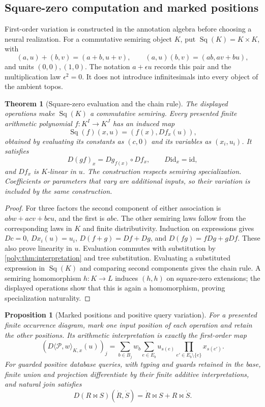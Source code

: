 \documentclass[11pt,a4paper]{article}
\newtheorem{theorem}{Theorem}[section]
\newtheorem{proposition}[proposition]{Proposition}
\theoremstyle{definition}
\theoremstyle{remark}\newaliascnt{remark}{theorem}
\newcommand{\id}{\mathrm{id}}
\numberwithin{equation}{section}
\begin{document}
\subsection{Square-zero computation and marked positions}
First-order variation is constructed in the annotation algebra before
choosing a neural realization. For a commutative semiring object $K$,
put $\operatorname{Sq}(K)=K\times K$, with
\[
 (a,u)+(b,v)=(a+b,u+v),\qquad
 (a,u)(b,v)=(ab,av+bu),
\]
and units $(0,0),(1,0)$. The notation $a+\epsilon u$ records this
pair and the multiplication law $\epsilon^2=0$. It does not introduce
infinitesimals into every object of the ambient topos.
\begin{theorem}[Square-zero evaluation and the chain rule]
\label{poly:thm:square-zero}
The displayed operations make $\operatorname{Sq}(K)$ a commutative
semiring. Every presented finite arithmetic polynomial $f:K^I\to K^J$
has an induced map
\[
 \operatorname{Sq}(f)(x,u)=(f(x),D f_x(u)),
\]
obtained by evaluating its constants as $(c,0)$ and its variables as
$(x_i,u_i)$. It satisfies
\[
 D(gf)_x=Dg_{f(x)}\circ Df_x,\qquad D\id_x=\id,
\]
and $Df_x$ is $K$-linear in $u$. The construction respects semiring
specialization. Coefficients or parameters that vary are additional
inputs, so their variation is included by the same construction.
\end{theorem}
\begin{proof}
For three factors the second component of either association is
$ab w+ac v+bc u$, and the first is $abc$. The other semiring laws follow
from the corresponding laws in $K$ and finite distributivity.
Induction on expressions gives $D c=0$, $D x_i(u)=u_i$,
$D(f+g)=Df+Dg$, and $D(fg)=fDg+gDf$. These also prove linearity
in $u$. Evaluation commutes with substitution by
\cref{poly:thm:interpretation} and tree substitution.
Evaluating a substituted expression in $\operatorname{Sq}(K)$
and comparing second components gives the chain rule. A semiring
homomorphism $h:K\to L$ induces $(h,h)$ on square-zero extensions;
the displayed operations show that this is again a homomorphism,
proving specialization naturality.
\end{proof}
\begin{proposition}[Marked positions and positive query variation]
\label{poly:prop:marked}
For a presented finite occurrence diagram, mark one input position
of each operation and retain the other positions. Its arithmetic
interpretation is exactly the first-order map
\begin{equation}\label{poly:eq:marked}
 (D\langle\mathcal P,w\rangle_{K,x}(u))_j
  =\sum_{b\in B_j}w_b\sum_{e\in E_b}
       u_{s(e)}\prod_{e'\in E_b\setminus\{e\}}x_{s(e')}.
\end{equation}
For guarded positive database queries, with typing and guards retained
in the base, finite union and projection differentiate by their finite
additive interpretations, and natural join satisfies
\[
 D(R\Join S)(\dot R,\dot S)
       =\dot R\Join S+R\Join\dot S.
\]
\end{proposition}
\end{document}
